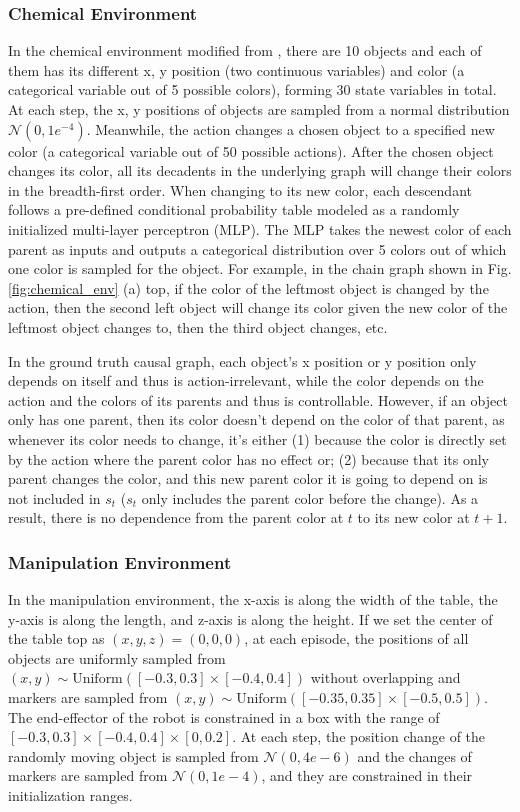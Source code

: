 \subsubsection{Chemical Environment}
In the chemical environment modified from \cite{ke2021systematic}, there are 10 objects and each of them has its different x, y position (two continuous variables) and color (a categorical variable out of 5 possible colors), forming 30 state variables in total.
At each step, the x, y positions of objects are sampled from a normal distribution $\mathcal{N}(0, 1e^{-4})$. Meanwhile, the action changes a chosen object to a specified new color (a categorical variable out of 50 possible actions). After the chosen object changes its color, all its decadents in the underlying graph will change their colors in the breadth-first order. When changing to its new color, each descendant follows a pre-defined conditional probability table modeled as a randomly initialized multi-layer perceptron (MLP). The MLP takes the newest color of each parent as inputs and outputs a categorical distribution over 5 colors out of which one color is sampled for the object. For example, in the chain graph shown in Fig. \ref{fig:chemical_env} (a) top, if the color of the leftmost object is changed by the action, then the second left object will change its color given the new color of the leftmost object changes to, then the third object changes, etc.

In the ground truth causal graph, each object's x position or y position only depends on itself and thus is action-irrelevant, while the color depends on the action and the colors of its parents and thus is controllable. However, if an object only has one parent, then its color doesn't depend on the color of that parent, as whenever its color needs to change, it's either (1) because the color is directly set by the action where the parent color has no effect or; (2) because that its only parent changes the color, and this new parent color it is going to depend on is not included in $s_t$ ($s_t$ only includes the parent color before the change). As a result, there is no dependence from the parent color at $t$ to its new color at $t + 1$.

\subsubsection{Manipulation Environment}

In the manipulation environment, the x-axis is along the width of the table, the y-axis is along the length, and z-axis is along the height. If we set the center of the table top as $(x, y, z)=(0, 0, 0)$, at each episode, the positions of all objects are uniformly sampled from $(x, y) \sim \text{Uniform}([-0.3, 0.3] \times [-0.4, 0.4])$ without overlapping and markers are sampled from $(x, y) \sim \text{Uniform}([-0.35, 0.35] \times [-0.5, 0.5])$. The end-effector of the robot is constrained in a box with the range of $[-0.3, 0.3] \times [-0.4, 0.4]\times [0, 0.2]$. At each step, the position change of the randomly moving object is sampled from $\mathcal{N}(0, 4e-6)$ and the changes of markers are sampled from $\mathcal{N}(0, 1e-4)$, and they are constrained in their initialization ranges.

